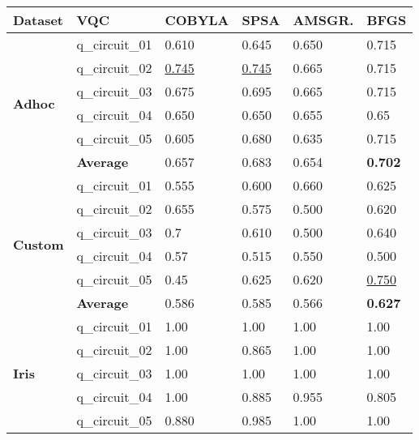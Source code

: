 \begin{table}[!h]
	\centering
	        
	\begin{tabular}{p{}p{}|p{}p{}p{}p{}}
		\hline 
		\textbf{Dataset}        & \textbf{VQC} & \textbf{COBYLA} & \textbf{SPSA}  & \textbf{AMSGR.} & \textbf{BFGS} \\
		\hline 
		\multirow{6}{*}{\textbf{Adhoc}}  & q\_circuit\_01  & 0.610  & 0.645 & 0.650    & 0.715 \\
		                        & q\_circuit\_02 & \underline{0.745}  & \underline{0.745} & 0.665    & 0.715 \\
		                        & q\_circuit\_03 & 0.675  & 0.695 & 0.665    & 0.715 \\
		                        & q\_circuit\_04 & 0.650  & 0.650 & 0.655    & 0.65 \\
		                        & q\_circuit\_05 & 0.605  & 0.680 & 0.635    & 0.715 \\
		\cline{2-6} 
		                        & \textbf{Average} & 0.657  & 0.683 & 0.654    & \textbf{0.702} \\
		\hline 
		\multirow{6}{*}{\textbf{Custom}} & q\_circuit\_01  & 0.555  & 0.600 & 0.660    & 0.625 \\
		                        & q\_circuit\_02  & 0.655  & 0.575 & 0.500    & 0.620 \\
		                        & q\_circuit\_03  & 0.7  & 0.610 & 0.500    & 0.640 \\
		                        & q\_circuit\_04  & 0.57  & 0.515 & 0.550    & 0.500 \\
		                        & q\_circuit\_05  & 0.45  & 0.625 & 0.620    & \underline{0.750} \\
		\cline{2-6} 
		                        & \textbf{Average} & 0.586  & 0.585 & 0.566    & \textbf{0.627} \\
		\hline 
		\multirow{6}{*}{\textbf{Iris}}   & q\_circuit\_01 & 1.00  & 1.00 & 1.00    & 1.00 \\
		                        & q\_circuit\_02 & 1.00  & 0.865 & 1.00    & 1.00 \\
		                        & q\_circuit\_03 & 1.00  & 1.00 & 1.00    & 1.00 \\
		                        & q\_circuit\_04 & 1.00  & 0.885 & 0.955    & 0.805 \\
		                        & q\_circuit\_05 & 0.880  & 0.985 & 1.00    & 1.00 \\

\end{tabular}
\end{table}
